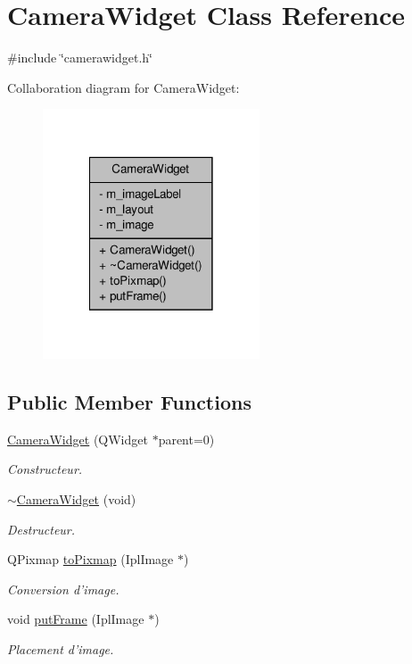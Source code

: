 \hypertarget{classCameraWidget}{\section{Camera\-Widget Class Reference}
\label{classCameraWidget}
}


{\ttfamily \#include \char`\"{}camerawidget.\-h\char`\"{}}



Collaboration diagram for Camera\-Widget\-:\nopagebreak
\begin{figure}[H]
\begin{center}
\leavevmode
\includegraphics[width=182pt]{classCameraWidget__coll__graph}
\end{center}
\end{figure}
\subsection*{Public Member Functions}
\begin{DoxyCompactItemize}
\item 
\hyperlink{classCameraWidget_a637ffd88fb213dad01dfa7294248029e}{Camera\-Widget} (Q\-Widget $\ast$parent=0)
\begin{DoxyCompactList}\small\item\em Constructeur. \end{DoxyCompactList}\item 
\hyperlink{classCameraWidget_a434ed0e3355c13cd4a51eba0dfcfa66a}{$\sim$\-Camera\-Widget} (void)
\begin{DoxyCompactList}\small\item\em Destructeur. \end{DoxyCompactList}\item 
Q\-Pixmap \hyperlink{classCameraWidget_a349b27ddfbcd67ae055f56e51ffe3e44}{to\-Pixmap} (Ipl\-Image $\ast$)
\begin{DoxyCompactList}\small\item\em Conversion d'image. \end{DoxyCompactList}\item 
void \hyperlink{classCameraWidget_a9ef3bc90490e18855ac24f29cc5cb20f}{put\-Frame} (Ipl\-Image $\ast$)
\begin{DoxyCompactList}\small\item\em Placement d'image. \end{DoxyCompactList}\end{DoxyCompactItemize}
